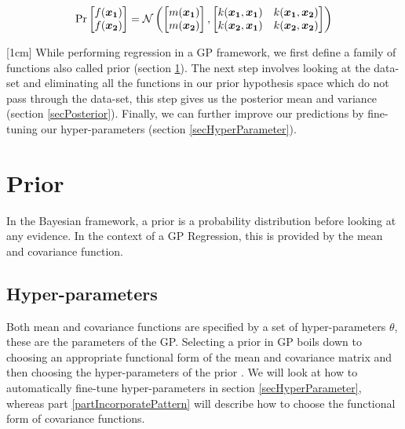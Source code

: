 \begin{equation}\label{equationGPMarginalizationProperty}
\Pr\left [ \begin{matrix}
f(\boldsymbol{x_1})
\\ f(\boldsymbol{x_2})
\end{matrix} \right ] = \mathcal{N}\left (\left [ \begin{matrix}
m(\boldsymbol{x_1})
\\ m(\boldsymbol{x_2})

\end{matrix} \right ] , \left [ \begin{matrix}
k(\boldsymbol{x_1}, \boldsymbol{x_1}) & k(\boldsymbol{x_1}, \boldsymbol{x_2})\\ 
k(\boldsymbol{x_2}, \boldsymbol{x_1}) & k(\boldsymbol{x_2}, \boldsymbol{x_2})
\end{matrix} \right ] \right )
\end{equation}

[1cm]
While performing regression in a GP framework, we first define a family of functions also called prior (section \ref{secPrior}). The next step involves looking at the data-set and eliminating all the functions in our prior hypothesis space which do not pass through the data-set, this step gives us the posterior mean and variance (section \ref{secPosterior}). Finally, we can further improve our predictions by fine-tuning our hyper-parameters (section \ref{secHyperParameter}).

\section{Prior} \label{secPrior}
In the Bayesian framework, a prior is a probability distribution before looking at any evidence. In the context of a GP Regression, this is provided by the mean and covariance function. 

\subsection{Hyper-parameters}
Both mean and covariance functions are specified by a set of hyper-parameters $\theta$, these are the parameters of the GP. Selecting a prior in GP boils down to choosing an appropriate functional form of the mean and covariance matrix and then choosing the hyper-parameters of the prior \cite{Rasmussen2005}. We will look at how to automatically fine-tune hyper-parameters in section \ref{secHyperParameter}, whereas part \ref{partIncorporatePattern} will describe how to choose the functional form of covariance functions.

